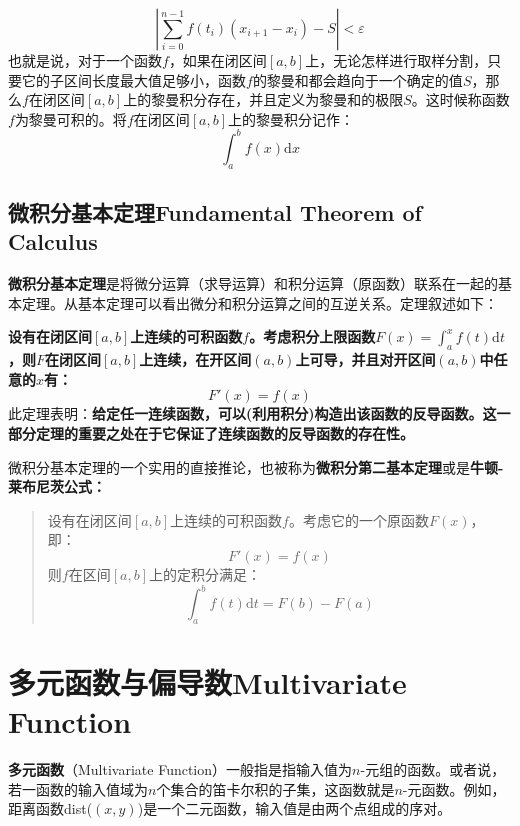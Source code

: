 \documentclass[UTF8]{ctexart}
\begin{document}
{\begin{question}
\begin{equation}
	\left|\sum _{i=0}^{n-1}f(t_{i})(x_{i+1}-x_{i})-S\right|<\varepsilon
\end{equation}
也就是说，对于一个函数$f$，如果在闭区间$[a,b]$上，无论怎样进行取样分割，只要它的子区间长度最大值足够小，函数$f$的黎曼和都会趋向于一个确定的值$S$，那么$f$在闭区间$[a,b]$上的黎曼积分存在，并且定义为黎曼和的极限$S$。这时候称函数$f$为黎曼可积的。将$f$在闭区间$[a,b]$上的黎曼积分记作：
\begin{equation}
	\int_a^b f(x) \mathrm{d} x
\end{equation}
\end{question}

\subsection{微积分基本定理Fundamental Theorem of Calculus}
\textbf{微积分基本定理}是将微分运算（求导运算）和积分运算（原函数）联系在一起的基本定理。从基本定理可以看出微分和积分运算之间的互逆关系。定理叙述如下：

\textbf{设有在闭区间$[a, b]$上连续的可积函数$f$。考虑积分上限函数$F(x) = \int_a^x f(t)\mathrm{d} t$，则$F$在闭区间$[a, b]$上连续，在开区间$(a, b)$上可导，并且对开区间$(a, b)$中任意的$x$有：}
\begin{equation}
	F'(x) = f(x)
\end{equation}
此定理表明：\textbf{给定任一连续函数，可以(利用积分)构造出该函数的反导函数。这一部分定理的重要之处在于它保证了连续函数的反导函数的存在性。}
\begin{info}[Notice:]微积分基本定理的一个实用的直接推论，也被称为\textbf{微积分第二基本定理}或是\textbf{牛顿-莱布尼茨公式：}
\begin{quote}
	设有在闭区间$[a,b]$上连续的可积函数$f$。考虑它的一个原函数$F(x)$，即：
\begin{equation}
	F'(x) = f(x)
\end{equation}
则$f$在区间$[a, b]$上的定积分满足：
\begin{equation}
	\int_a^b f(t) \mathrm{d} t = F(b) - F(a)
\end{equation}
\end{quote}
\end{info}

\section{多元函数与偏导数Multivariate Function}
\textbf{多元函数}（Multivariate Function）一般指是指输入值为$n$-元组的函数。或者说，若一函数的输入值域为$n$个集合的笛卡尔积的子集，这函数就是$n$-元函数。例如，距离函数dist($(x,y)$)是一个二元函数，输入值是由两个点组成的序对。

}
\end{document}
